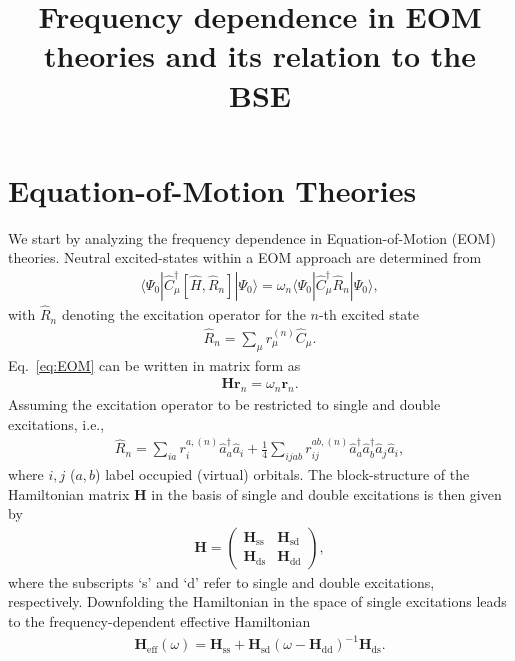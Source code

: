 \documentclass[aip,jcp,reprint,noshowkeys,superscriptaddress]{revtex4-1}
\newcommand{\LCPQ}{Laboratoire de Chimie et Physique Quantiques (UMR 5626), Universit\'e de Toulouse, CNRS, UPS, France}
\begin{document}
\title{Frequency dependence in EOM theories and its relation to the BSE}

\maketitle


\section{Equation-of-Motion Theories}

We start by analyzing the frequency dependence in Equation-of-Motion (EOM) theories.
Neutral excited-states within a EOM approach are determined from 
\begin{align}
 \langle \Psi_0 | \hat{C}^\dagger_\mu [\hat{H}, \hat{R}_n] | \Psi_0 \rangle = \omega_n \langle \Psi_0 | \hat{C}^\dagger_\mu \hat{R}_n | \Psi_0 \rangle,
 \label{eq:EOM}
\end{align}
with $\hat{R}_n$ denoting the excitation operator for the $n$-th excited state 
\begin{align}
  \hat{R}_n = \sum_\mu r_\mu^{(n)} \hat{C}_\mu.
\end{align}
Eq.~\eqref{eq:EOM} can be written in matrix form as
\begin{align}
 \mathbf{H} \mathbf{r}_n = \omega_n  \mathbf{r}_n.
\end{align}
Assuming the excitation operator to be restricted to single and double excitations, i.e.,
\begin{align}
  \hat{R}_n = \sum_{ia} r_i^{a,(n)} \hat{a}^\dagger_a \hat{a}_i + \frac{1}{4} \sum_{ijab} r_{ij}^{ab,(n)} \hat{a}^\dagger_a \hat{a}^\dagger_b \hat{a}_j \hat{a}_i,
\end{align}
where $i,j$ ($a,b$) label occupied (virtual) orbitals.
The block-structure of the Hamiltonian matrix $\mathbf{H}$ in the basis of single and double excitations is then given by
\begin{align}
\mathbf{H} = \begin{pmatrix}
 \mathbf{H}_{\text{ss}} & \mathbf{H}_{\text{sd}} \\
 \mathbf{H}_{\text{ds}} & \mathbf{H}_{\text{dd}}
\end{pmatrix},
\end{align}
where the subscripts `s' and `d' refer to single and double excitations, respectively.
Downfolding the Hamiltonian in the space of single excitations leads to the frequency-dependent effective Hamiltonian
\begin{align}
\mathbf{H}_{\text{eff}}(\omega) = \mathbf{H}_{\text{ss}} + \mathbf{H}_{\text{sd}} (\omega - \mathbf{H}_{\text{dd}})^{-1} \mathbf{H}_{\text{ds}}.
\end{align}
\end{document}
